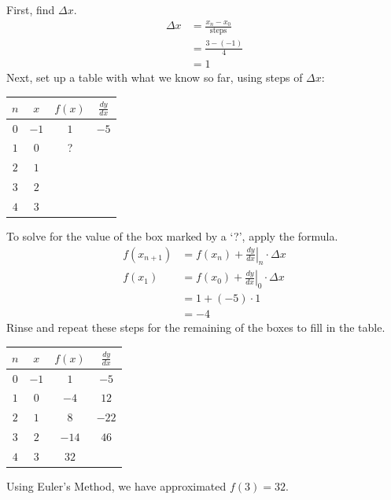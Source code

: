 \documentclass[12pt]{article}
\begin{document}
\noindent First, find $\Delta x$.
\begin{align*}
    \Delta x & = \frac{x_n - x_0}{\text{steps}} \\[6pt]
             & = \frac{3-(-1)}{4}               \\[6pt]
             & = 1
\end{align*}
Next, set up a table with what we know so far, using steps of $\Delta x$:
\begin{center}
    \begin{tabular}{|c|c|c|c|}
        \hline
        $n$ & $x$  & $f(x)$ & $\frac{dy}{dx}$ \\
        \hline \hline
        $0$ & $-1$ & $1$    & $-5$            \\
        \hline
        $1$ & $0$  & ?      &                 \\
        \hline
        $2$ & $1$  &        &                 \\
        \hline
        $3$ & $2$  &        &                 \\
        \hline
        $4$ & $3$  &        &                 \\
        \hline
    \end{tabular}
\end{center}
To solve for the value of the box marked by a `?', apply the formula.
\begin{align*}
    f(x_{n+1}) & = f(x_n) + \left. \frac{dy}{dx} \right \vert_n \cdot \Delta x \\[6pt]
    f(x_1)     & = f(x_0) + \left. \frac{dy}{dx} \right \vert_0 \cdot \Delta x \\[6pt]
               & = 1 + (-5) \cdot 1                                            \\
               & = -4
\end{align*}
Rinse and repeat these steps for the remaining of the boxes to fill in the table.
\begin{center}
    \begin{tabular}{|c|c|c|c|}
        \hline
        $n$ & $x$  & $f(x)$ & $\frac{dy}{dx}$ \\
        \hline \hline
        $0$ & $-1$ & $1$    & $-5$            \\
        \hline
        $1$ & $0$  & $-4$   & $12$            \\
        \hline
        $2$ & $1$  & $8$    & $-22$           \\
        \hline
        $3$ & $2$  & $-14$  & $46$            \\
        \hline
        $4$ & $3$  & $32$   &                 \\
        \hline
    \end{tabular}
\end{center}
Using Euler's Method, we have approximated $f(3) = 32$.
\end{document}

